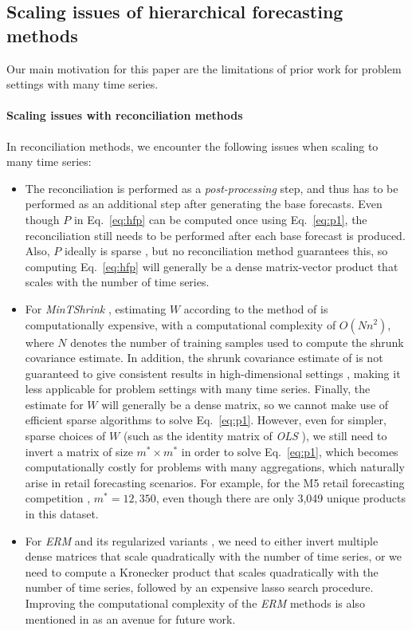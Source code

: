 \documentclass[preprint, 3p, times, twocolumn]{elsarticle}
\begin{document}
\subsection{Scaling issues of hierarchical forecasting methods} \label{subsec:ourwork}

Our main motivation for this paper are the limitations of prior work for problem settings with many time series.

\paragraph{Scaling issues with reconciliation methods} \label{sec:scalingissuesreconmethods}
In reconciliation methods, we encounter the following issues when scaling to many time series:
\begin{itemize}
  \item The reconciliation is performed as a \textit{post-processing} step, and thus has to be performed as an additional step after generating the base forecasts. Even though \(P\) in Eq.~\ref{eq:hfp} can be computed once using Eq.~\eqref{eq:p1}, the reconciliation still needs to be performed after each base forecast is produced. Also, \(P\) ideally is sparse \cite{bentaieb_regularized_2019}, but no reconciliation method guarantees this, so computing Eq.~\ref{eq:hfp} will generally be a dense matrix-vector product that scales with the number of time series.
  \item For \textit{MinTShrink} \cite{wickramasuriya_optimal_2019}, estimating \(W\) according to the method of \cite{schafer_shrinkage_2005} is computationally expensive, with a computational complexity of \(O(Nn^2)\), where \(N\) denotes the number of training samples used to compute the shrunk covariance estimate. In addition, the shrunk covariance estimate of \cite{schafer_shrinkage_2005} is not guaranteed to give consistent results in high-dimensional settings \cite{touloumis_nonparametric_2015}, making it less applicable for problem settings with many time series. Finally, the estimate for \(W\) will generally be a dense matrix, so we cannot make use of efficient sparse algorithms to solve Eq.~\eqref{eq:p1}. However, even for simpler, sparse choices of \(W\) (such as the identity matrix of \textit{OLS} \cite{hyndman_optimal_2011}), we still need to invert a matrix of size \(m^* \times m^*\) in order to solve Eq.~\eqref{eq:p1}, which becomes computationally costly for problems with many aggregations, which naturally arise in retail forecasting scenarios. For example, for the M5 retail forecasting competition \cite{makridakis_m5_2021}, \(m^*=12,350\), even though there are only 3,049 unique products in this dataset.  
  \item For \textit{ERM} and its regularized variants \cite{bentaieb_regularized_2019}, we need to either invert multiple dense matrices that scale quadratically with the number of time series, or we need to compute a Kronecker product that scales quadratically with the number of time series, followed by an expensive lasso search procedure. Improving the computational complexity of the \textit{ERM} methods is also mentioned in \cite{bentaieb_regularized_2019} as an avenue for future work.
\end{itemize}
\end{document}
